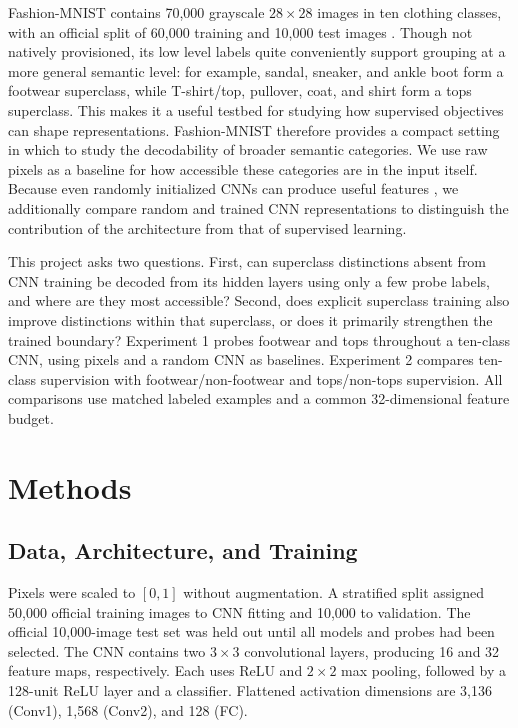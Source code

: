 \documentclass[conference]{IEEEtran}
\begin{document}
Fashion-MNIST contains 70,000 grayscale $28\!\times\!28$ images in ten clothing
classes, with an official split of 60,000 training and 10,000 test images
\cite{xiao2017}. Though not natively provisioned, its low level labels quite conveniently support grouping at a more general semantic level: for
example, sandal, sneaker, and ankle boot form a footwear superclass, while
T-shirt/top, pullover, coat, and shirt form a tops superclass. This makes it a
useful testbed for studying how supervised objectives can shape representations.
Fashion-MNIST therefore provides a compact setting in which to study the decodability of broader semantic categories. We use raw pixels as a baseline for how accessible these categories are in the input itself. Because even randomly initialized CNNs can produce useful features \cite{xue2018}, we additionally compare random and trained CNN representations to distinguish the contribution of the architecture from that of supervised learning.

This project asks two questions. First, can superclass distinctions absent from
CNN training be decoded from its hidden layers using only a few probe labels,
and where are they most accessible? Second, does explicit superclass training
also improve distinctions within that superclass, or does it primarily
strengthen the trained boundary? Experiment 1 probes footwear and tops
throughout a ten-class CNN, using pixels and a random CNN as baselines.
Experiment 2 compares ten-class supervision with footwear/non-footwear and
tops/non-tops supervision. All comparisons use matched labeled examples and a
common 32-dimensional feature budget.

\section{Methods}
\subsection{Data, Architecture, and Training}
Pixels were scaled to $[0,1]$ without augmentation. A stratified split assigned
50,000 official training images to CNN fitting and 10,000 to validation. The
official 10,000-image test set was held out until all models and probes had
been selected. The CNN contains two \(3\times3\) convolutional layers, producing 16 and 32 feature maps, respectively. Each uses ReLU and $2\!\times\!2$ max pooling, followed by a
128-unit ReLU layer and a classifier. Flattened activation dimensions are
3,136 (Conv1), 1,568 (Conv2), and 128 (FC).
\end{document}
